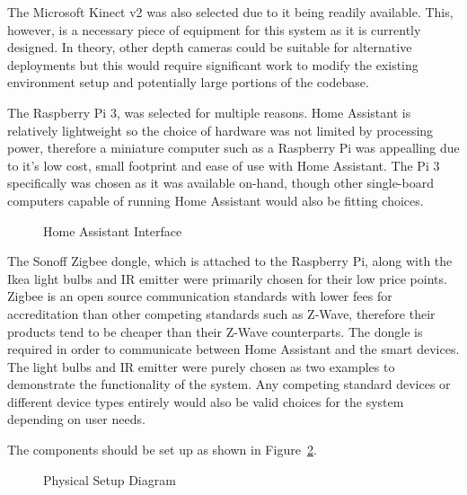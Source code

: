 The Microsoft Kinect v2 was also selected due to it being readily available.
This, however, is a necessary piece of equipment for this system as it is currently designed.
In theory, other depth cameras could be suitable for alternative deployments but this would require significant work to modify the existing environment setup and potentially large portions of the codebase.

The Raspberry Pi 3, was selected for multiple reasons.
Home Assistant is relatively lightweight so the choice of hardware was not limited by processing power, therefore a miniature computer such as a Raspberry Pi was appealling due to it's low cost, small footprint and ease of use with Home Assistant.
The Pi 3 specifically was chosen as it was available on-hand, though other single-board computers capable of running Home Assistant would also be fitting choices.

\begin{figure}[!htb]
    \caption{Home Assistant Interface}
    \label{fig:home_assistant}
\end{figure}

The Sonoff Zigbee dongle, which is attached to the Raspberry Pi, along with the Ikea light bulbs and IR emitter were primarily chosen for their low price points.
Zigbee is an open source communication standards with lower fees for accreditation than other competing standards such as Z-Wave, therefore their products tend to be cheaper than their Z-Wave counterparts.
The dongle is required in order to communicate between Home Assistant and the smart devices.
The light bulbs and IR emitter were purely chosen as two examples to demonstrate the functionality of the system.
Any competing standard devices or different device types entirely would also be valid choices for the system depending on user needs.

The components should be set up as shown in Figure~\ref{fig:physical_setup_diagram}.

\begin{figure}[H]
    \caption{Physical Setup Diagram}
    \label{fig:physical_setup_diagram}
\end{figure}

